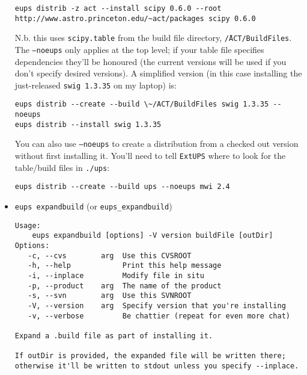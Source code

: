 \documentclass{article}
\newcommand{\code}[1]{\texttt{#1}}
\newcommand{\eups}{\code{ExtUPS}}
\begin{document}
\begin{itemize}
\begin{verbatim}
eups distrib -z act --install scipy 0.6.0 --root http://www.astro.princeton.edu/~act/packages scipy 0.6.0
\end{verbatim}
N.b. this uses \code{scipy.table} from the build file directory, \code{\~/ACT/BuildFiles}. The
\code{--noeups} only applies at the top level;  if your table file specifies dependencies
they'll be honoured (the current versions will be used if you don't specify desired versions). A
simplified version (in this case installing the just-released \code{swig 1.3.35} on my laptop) is:
\begin{verbatim}
eups distrib --create --build \~/ACT/BuildFiles swig 1.3.35 --noeups
eups distrib --install swig 1.3.35
\end{verbatim}

You can also use \code{--noeups} to create a distribution from a checked out version without
first installing it.  You'll need to tell \eups{} where to look for the table/build files
in \code{./ups}:
\begin{verbatim}
eups distrib --create --build ups --noeups mwi 2.4
\end{verbatim}


  \item \code{eups expandbuild} (or \code{eups\_expandbuild})
\begin{verbatim}
Usage:
    eups expandbuild [options] -V version buildFile [outDir]
Options:
   -c, --cvs        arg  Use this CVSROOT
   -h, --help            Print this help message
   -i, --inplace         Modify file in situ
   -p, --product    arg  The name of the product
   -s, --svn        arg  Use this SVNROOT   
   -V, --version    arg  Specify version that you're installing
   -v, --verbose         Be chattier (repeat for even more chat)
    
Expand a .build file as part of installing it.

If outDir is provided, the expanded file will be written there;
otherwise it'll be written to stdout unless you specify --inplace.
\end{verbatim}


\end{itemize}
\end{document}
